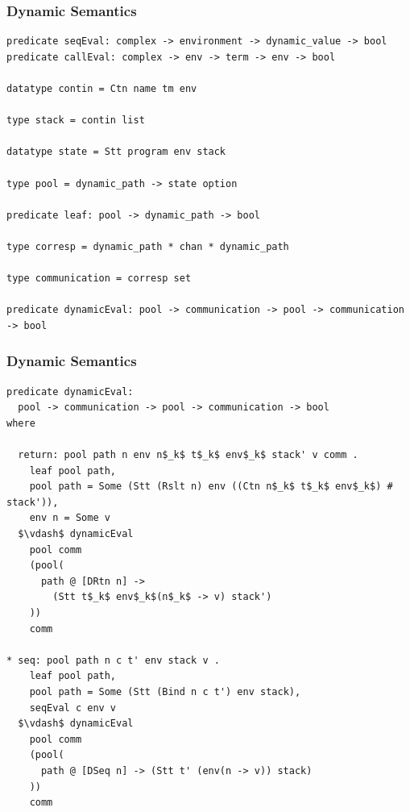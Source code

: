 \documentclass{beamer}
\begin{document}
\begin{frame}[fragile]
\frametitle{Dynamic Semantics}
\begin{lstlisting}[language=logic, mathescape]
predicate seqEval: complex -> environment -> dynamic_value -> bool 
predicate callEval: complex -> env -> term -> env -> bool 

datatype contin = Ctn name tm env

type stack = contin list

datatype state = Stt program env stack 

type pool = dynamic_path -> state option

predicate leaf: pool -> dynamic_path -> bool

type corresp = dynamic_path * chan * dynamic_path

type communication = corresp set 

predicate dynamicEval: pool -> communication -> pool -> communication -> bool
\end{lstlisting}
\end{frame}


\begin{frame}[fragile]
	\frametitle{Dynamic Semantics}
\begin{lstlisting}[language=logic, mathescape]
predicate dynamicEval:
  pool -> communication -> pool -> communication -> bool
where

  return: pool path n env n$_k$ t$_k$ env$_k$ stack' v comm .
    leaf pool path,
    pool path = Some (Stt (Rslt n) env ((Ctn n$_k$ t$_k$ env$_k$) # stack')),
    env n = Some v
  $\vdash$ dynamicEval
    pool comm
    (pool(
      path @ [DRtn n] ->
        (Stt t$_k$ env$_k$(n$_k$ -> v) stack')
    ))
    comm

* seq: pool path n c t' env stack v .
    leaf pool path,
    pool path = Some (Stt (Bind n c t') env stack),
    seqEval c env v
  $\vdash$ dynamicEval
    pool comm
    (pool(
      path @ [DSeq n] -> (Stt t' (env(n -> v)) stack)
    ))
    comm
\end{lstlisting}
\end{frame}
\end{document}
